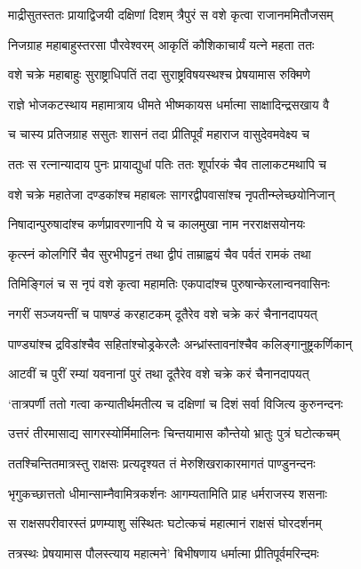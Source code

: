 \twolineshloka
{माद्रीसुतस्ततः प्रायाद्विजयी दक्षिणां दिशम्}
{त्रैपुरं स वशे कृत्वा राजानममितौजसम्}


\twolineshloka
{निजग्राह महाबाहुस्तरसा पौरवेश्वरम्}
{आकृतिं कौशिकाचार्यं यत्ने महता ततः}


\twolineshloka
{वशे चक्रे महाबाहुः सुराष्ट्राधिपतिं तदा}
{सुराष्ट्रविषयस्थश्च प्रेषयामास रुक्मिणे}


\twolineshloka
{राज्ञे भोजकटस्थाय महामात्राय धीमते}
{भीष्मकायस धर्मात्मा साक्षादिन्द्रसखाय वै}


\twolineshloka
{च चास्य प्रतिजग्राह ससुतः शासनं तदा}
{प्रीतिपूर्वं महाराज वासुदेवमवेक्ष्य च}


\twolineshloka
{ततः स रत्नान्यादाय पुनः प्रायाद्युधां पतिः}
{ततः शूर्पारकं चैव तालाकटमथापि च}


\twolineshloka
{वशे चक्रे महातेजा दण्डकांश्च महाबलः}
{सागरद्वीपवासांश्च नृपतीन्म्लेच्छयोनिजान्}


\twolineshloka
{निषादान्पुरुषादांश्च कर्णप्रावरणानपि}
{ये च कालमुखा नाम नरराक्षसयोनयः}


\twolineshloka
{कृत्स्नं कोलगिरिं चैव सुरभीपट्टनं तथा}
{द्वीपं ताम्राह्वयं चैव पर्वतं रामकं तथा}


\twolineshloka
{तिमिङ्गिलं च स नृपं वशे कृत्वा महामतिः}
{एकपादांश्च पुरुषान्केरलान्वनवासिनः}


\twolineshloka
{नगरीं सञ्जयन्तीं च पाषण्डं करहाटकम्}
{दूतैरेव वशे चक्रे करं चैनानदापयत्}


\twolineshloka
{पाण्ड्यांश्च द्रविडांश्चैव सहितांश्चोड्रकेरलैः}
{अन्ध्रांस्तावनांश्चैव कलिङ्गानुष्ट्रकर्णिकान्}


\twolineshloka
{आटवीं च पुरीं रम्यां यवनानां पुरं तथा}
{दूतैरेव वशे चक्रे करं चैनानदापयत्}


\twolineshloka
{`तात्रपर्णी ततो गत्वा कन्यातीर्थमतीत्य च}
{दक्षिणां च दिशं सर्वा विजित्य कुरुनन्दनः}


\twolineshloka
{उत्तरं तीरमासाद्य सागरस्योर्मिमालिनः}
{चिन्तयामास कौन्तेयो भ्रातुः पुत्रं घटोत्कचम्}


\twolineshloka
{ततश्चिन्तितमात्रस्तु राक्षसः प्रत्यदृश्यत}
{तं मेरुशिखराकारमागतं पाण्डुनन्दनः}


\twolineshloka
{भृगुकच्छात्ततो धीमान्साम्नैवामित्रकर्शनः}
{आगम्यतामिति प्राह धर्मराजस्य शसनाः}


\twolineshloka
{स राक्षसपरीवारस्तं प्रणम्याशु संस्थितः}
{घटोत्कचं महात्मानं राक्षसं घोरदर्शनम्}


\twolineshloka
{तत्रस्थः प्रेषयामास पौलस्त्याय महात्मने'}
{बिभीषणाय धर्मात्मा प्रीतिपूर्वमरिन्दमः}


